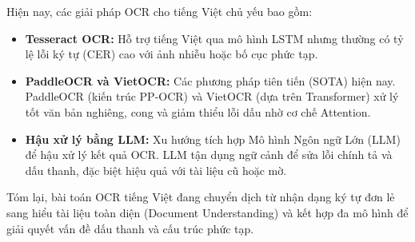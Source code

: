 Hiện nay, các giải pháp OCR cho tiếng Việt chủ yếu bao gồm:

\begin{itemize}
    \item \textbf{Tesseract OCR:} Hỗ trợ tiếng Việt qua mô hình LSTM nhưng thường có tỷ lệ lỗi ký tự (CER) cao với ảnh nhiễu hoặc bố cục phức tạp.
    \item \textbf{PaddleOCR và VietOCR:} Các phương pháp tiên tiến (SOTA) hiện nay. PaddleOCR (kiến trúc PP-OCR) và VietOCR (dựa trên Transformer) xử lý tốt văn bản nghiêng, cong và giảm thiểu lỗi dấu nhờ cơ chế Attention.
    \item \textbf{Hậu xử lý bằng LLM:} Xu hướng tích hợp Mô hình Ngôn ngữ Lớn (LLM) để hậu xử lý kết quả OCR. LLM tận dụng ngữ cảnh để sửa lỗi chính tả và dấu thanh, đặc biệt hiệu quả với tài liệu cũ hoặc mờ.
\end{itemize}

Tóm lại, bài toán OCR tiếng Việt đang chuyển dịch từ nhận dạng ký tự đơn lẻ sang hiểu tài liệu toàn diện (Document Understanding) và kết hợp đa mô hình để giải quyết vấn đề dấu thanh và cấu trúc phức tạp.